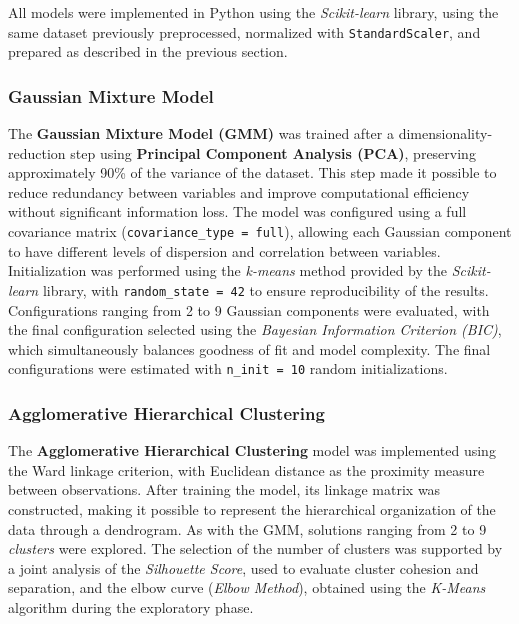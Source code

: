 \documentclass[a4paper,fleqn]{cas-sc}
\newcommand{\newtextorange}[1]{{\color{revorange}#1}}
\begin{document}
All models were implemented in Python using the \textit{Scikit-learn} library, using the same dataset previously preprocessed, normalized with \texttt{StandardScaler}, and prepared as described in the previous section.

\subsubsection{Gaussian Mixture Model}

The \textbf{Gaussian Mixture Model (GMM)} was trained after a dimensionality-reduction step using \textbf{Principal Component Analysis (PCA)}, preserving approximately 90\% of the variance of the dataset. This step made it possible to reduce redundancy between variables and improve computational efficiency without significant information loss. The model was configured using a full covariance matrix (\texttt{covariance\_type = full}), allowing each Gaussian component to have different levels of dispersion and correlation between variables. Initialization was performed using the \textit{k-means} method provided by the \textit{Scikit-learn} library, with \texttt{random\_state = 42} to ensure reproducibility of the results. Configurations ranging from 2 to 9 Gaussian components were evaluated, with the final configuration selected using the \textit{Bayesian Information Criterion (BIC)}, which simultaneously balances goodness of fit and model complexity. \newtextorange{The final configurations were estimated with \texttt{n\_init = 10} random initializations.}

\subsubsection{Agglomerative Hierarchical Clustering}

The \textbf{Agglomerative Hierarchical Clustering} model was implemented using the Ward linkage criterion, with Euclidean distance as the proximity measure between observations. After training the model, its linkage matrix was constructed, making it possible to represent the hierarchical organization of the data through a dendrogram. As with the GMM, solutions ranging from 2 to 9 \textit{clusters} were explored. The selection of the number of clusters was supported by a joint analysis of the \textit{Silhouette Score}, used to evaluate cluster cohesion and separation, and the elbow curve (\textit{Elbow Method}), obtained using the \textit{K-Means} algorithm during the exploratory phase.
\end{document}
